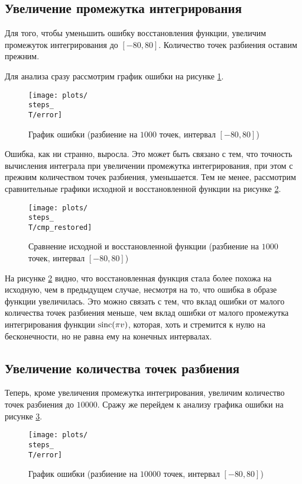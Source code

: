 \subsection{Увеличение промежутка интегрирования}
\def\steps{1000}
\def\T{80}
Для того, чтобы уменьшить ошибку восстановления функции, увеличим промежуток интегрирования до $[-\T, \T]$. Количество точек разбиения оставим прежним.

Для анализа сразу рассмотрим график ошибки на рисунке \ref{fig:\steps_\T_error}.
\begin{figure}[ht!]
    \centering
    \texttt{[image: plots/\\steps\_\\T/error]}
    \caption{График ошибки (разбиение на $\steps$ точек, интервал $[-\T, \T]$)}
    \label{fig:\steps_\T_error}
\end{figure}

Ошибка, как ни странно, выросла. Это может быть связано с тем, что точность вычисления интеграла при увеличении промежутка 
интегрирования, при этом с прежним количеством точек разбиения, уменьшается. Тем не менее, рассмотрим сравнительные графики 
исходной и восстановленной функции на рисунке \ref{fig:\steps_\T_cmp_restored}.
\begin{figure}[ht!]
    \centering
    \texttt{[image: plots/\\steps\_\\T/cmp\_restored]}
    \caption{Сравнение исходной и восстановленной функции (разбиение на $\steps$ точек, интервал $[-\T, \T]$)}
    \label{fig:\steps_\T_cmp_restored}
\end{figure}

На рисунке \ref{fig:\steps_\T_cmp_restored} видно, что восстановленная функция стала более похожа на исходную, чем в предыдущем случае, 
несмотря на то, что ошибка в образе функции увеличилась. Это можно связать с тем, что вклад ошибки от малого количества 
точек разбиения меньше, чем вклад ошибки от малого промежутка интегрирования функции $\operatorname{\text{sinc}}(\pi v)$, которая, 
хоть и стремится к нулю на бесконечности, но не равна ему на конечных интервалах.

\subsection{Увеличение количества точек разбиения}
\def\steps{10000}
\def\T{80}
Теперь, кроме увеличения промежутка интегрирования, увеличим количество точек разбиения до $\steps$. Сражу же перейдем 
к анализу графика ошибки на рисунке \ref{fig:\steps_\T_error}.
\begin{figure}[ht!]
    \centering
    \texttt{[image: plots/\\steps\_\\T/error]}
    \caption{График ошибки (разбиение на $\steps$ точек, интервал $[-\T, \T]$)}
    \label{fig:\steps_\T_error}
\end{figure}

